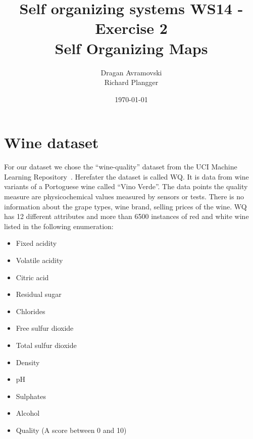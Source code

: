\documentclass{acm_proc_article-sp}
\begin{document}
\title{Self organizing systems WS14 - Exercise 2\\
       Self Organizing Maps}%

\author{
\alignauthor
Dragan Avramovski\\
\alignauthor
Richard Plangger\\
}

\date{\today}

\maketitle


\begin{abstract}
\end{abstract}


\section{Wine dataset}

For our dataset we chose the ``wine-quality'' dataset from the UCI Machine Learning Repository~\cite{ucirepo}. 
Herefater the dataset is called WQ.
It is data from wine variants of a Portoguese wine called ``Vino Verde''.
The data points the quality measure are physicochemical values measured
by sensors or tests. There is no information about the grape types,
wine brand, selling prices of the wine.
WQ has 12 different attributes and more than 6500 instances of red and white wine listed in the following enumeration:

\begin{itemize}
    \item Fixed acidity
    \item Volatile acidity
    \item Citric acid
    \item Residual sugar
    \item Chlorides
    \item Free sulfur dioxide
    \item Total sulfur dioxide
    \item Density
    \item pH
    \item Sulphates
    \item Alcohol
    \item Quality (A score between 0 and 10)
\end{itemize}
\end{document}
